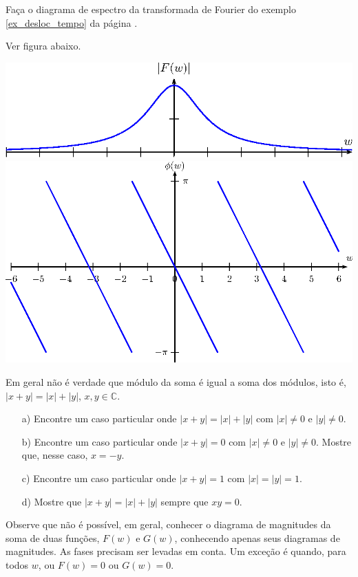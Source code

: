 \begin{exer}Faça o diagrama de espectro da transformada de Fourier do exemplo \ref{ex_desloc_tempo} da página \pageref{ex_desloc_tempo}.
\end{exer}
\begin{resp}Ver figura abaixo.
\begin{center}
\includegraphics{cap_propriedades_transformada/pics/figura_11}
\includegraphics{cap_propriedades_transformada/pics/figura_12}\end{center}
\end{resp}
\begin{exer} Em geral não é verdade que módulo da soma é igual a soma dos módulos, isto é, $|x+y|=|x|+|y|$, $x,y\in\mathbb{C}$.
\begin{itemize}
\item[a)] Encontre um caso particular onde $|x+y|=|x|+|y|$ com $|x|\neq 0$ e $|y|\neq 0$.
\item[b)] Encontre um caso particular onde $|x+y|=0$ com $|x|\neq 0$ e $|y|\neq 0$. Mostre que, nesse caso, $x=-y$.
\item[c)] Encontre um caso particular onde $|x+y|=1$ com $|x|=|y|=1$.
\item[d)] Mostre que $|x+y|=|x|+|y|$ sempre que $xy=0$.
\end{itemize}
Observe que não é possível, em geral, conhecer o diagrama de magnitudes da soma de duas funções, $F(w)$ e $G(w)$, conhecendo apenas seus diagramas de magnitudes. As fases precisam ser levadas em conta. Um exceção é quando, para todos $w$, ou $F(w)=0$ ou $G(w)=0$.
\end{exer} 

